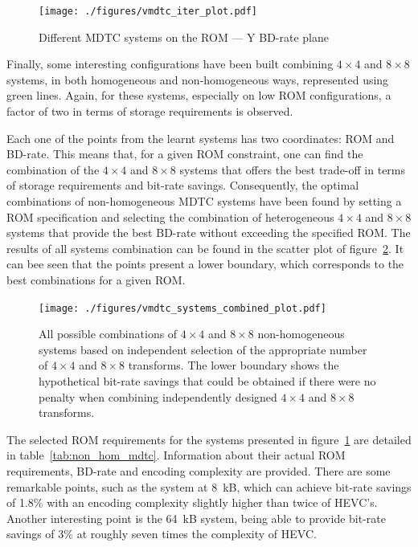 \documentclass[11pt,a4paper,openright,twoside]{book}
\def\usepdfs{1} %
\numberwithin{equation}{section} %
\numberwithin{figure}{section} %
\numberwithin{table}{section} %
\begin{document}
\begin{figure}[tb]
	\centering
	\ifthenelse{\usepdfs = 0}
	{}
	{\texttt{[image: ./figures/vmdtc\_iter\_plot.pdf]}}
	\caption{Different \acs{MDTC} systems on the \acs{ROM} --- Y \acs{BD}-rate
	plane}
	\label{fig:vmdtc_iter}
\end{figure}

Finally, some interesting configurations have been built combining $4\times4$
and $8\times8$ systems, in both homogeneous and non-homogeneous ways,
represented using green lines.
Again, for these systems, especially on low \acs{ROM} configurations, a factor
of two in terms of storage requirements is observed.

Each one of the points from the learnt systems has two coordinates: \acs{ROM}
and \ac{BD}-rate.
This means that, for a given \acs{ROM} constraint, one can find the
combination of the $4\times4$ and $8\times8$ systems that offers the best
trade-off in terms of storage requirements and bit-rate savings.
Consequently, the optimal combinations of non-homogeneous \ac{MDTC} systems
have been found by setting a \acs{ROM} specification and selecting the
combination of heterogeneous $4\times4$ and $8\times8$ systems that provide
the best \ac{BD}-rate without exceeding the specified \acs{ROM}.
The results of all systems combination can be found in the scatter plot of
figure~\ref{fig:vmdtc_combined}.
It can bee seen that the points present a lower boundary, which corresponds to
the best combinations for a given \acs{ROM}.

\begin{figure}[tb]
	\centering
	\ifthenelse{\usepdfs = 0}
	{}
	{\texttt{[image: ./figures/vmdtc\_systems\_combined\_plot.pdf]}}
	\caption[All possible combinations of $4\times4$ and $8\times8$
	non-homogeneous systems]
	{All possible combinations of $4\times4$ and $8\times8$
	non-homogeneous systems based on independent selection of the appropriate
	number of $4\times4$ and $8\times8$ transforms.
	The lower boundary shows the hypothetical bit-rate savings that could be
	obtained if there were no penalty when combining independently designed
	$4\times4$ and $8\times8$ transforms.}
	\label{fig:vmdtc_combined}
\end{figure}

The selected \acs{ROM} requirements for the systems presented in
figure~\ref{fig:vmdtc_iter} are detailed in
table~\ref{tab:non_hom_mdtc}.
Information about their actual \acs{ROM} requirements, \ac{BD}-rate and
encoding complexity are provided.
There are some remarkable points, such as the system at \SI{8}{\kilo B},
which can achieve bit-rate savings of 1.8\% with an encoding complexity
slightly higher than twice of \ac{HEVC}'s.
Another interesting point is the \SI{64}{\kilo B} system, being able to
provide bit-rate savings of 3\% at roughly seven times the complexity of
\ac{HEVC}.
\end{document}
